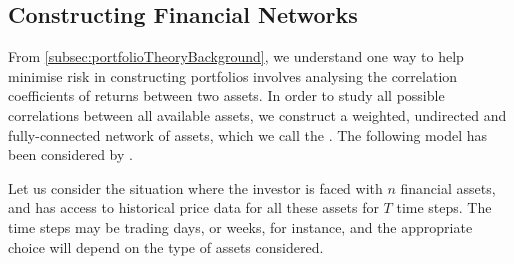 \subsection{Constructing Financial Networks}
\label{subsec:financialNetworksConstructionBackground}

From \cref{subsec:portfolioTheoryBackground}, we understand one way to help minimise risk in constructing portfolios involves analysing the correlation coefficients of returns between two assets.
In order to study all possible correlations between all available assets, we construct a weighted, undirected and fully-connected network of assets, which we call the . The following model has been considered by \cite{PGR+99,OCK+02,OKK03,FPM+10,MG13}.

Let us consider the situation where the investor is faced with $n$ financial assets, and has access to historical price data for all these assets for $T$ time steps.
The time steps may be trading days, or weeks, for instance, and the appropriate choice will depend on the type of assets considered.

